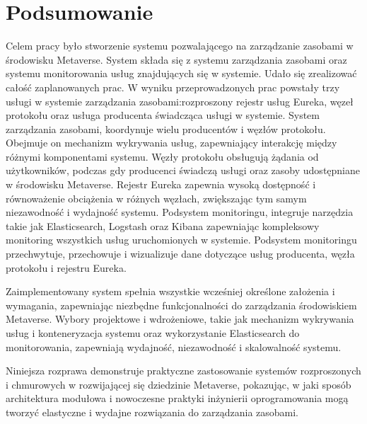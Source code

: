 \chapter{Podsumowanie}

Celem pracy było stworzenie systemu  pozwalającego na zarządzanie zasobami w środowisku Metaverse. System składa się z systemu zarządzania zasobami oraz systemu monitorowania usług znajdujących się w systemie. Udało się zrealizować całość zaplanowanych prac. W wyniku przeprowadzonych prac powstały trzy usługi w systemie zarządzania zasobami:rozproszony rejestr usług Eureka, węzeł protokołu oraz usługa producenta świadcząca usługi w systemie. System zarządzania zasobami, koordynuje wielu producentów i węzłów protokołu. Obejmuje on mechanizm wykrywania usług, zapewniający interakcję między różnymi komponentami systemu. Węzły protokołu obsługują żądania od użytkowników, podczas gdy producenci świadczą usługi oraz zasoby udostępniane w środowisku Metaverse. Rejestr Eureka zapewnia wysoką dostępność i równoważenie obciążenia w różnych węzłach, zwiększając tym samym niezawodność i wydajność systemu. Podsystem monitoringu, integruje narzędzia takie jak Elasticsearch, Logstash oraz Kibana zapewniając kompleksowy monitoring wszystkich usług uruchomionych w systemie. Podsystem monitoringu przechwytuje, przechowuje i wizualizuje dane dotyczące usług producenta, węzła protokołu i rejestru Eureka. 

Zaimplementowany system spełnia wszystkie wcześniej określone założenia i wymagania, zapewniając niezbędne funkcjonalności do zarządzania środowiskiem Metaverse. Wybory projektowe i wdrożeniowe, takie jak mechanizm wykrywania usług i konteneryzacja systemu oraz wykorzystanie Elasticsearch do monitorowania, zapewniają wydajność, niezawodność i skalowalność systemu.

Niniejsza rozprawa demonstruje praktyczne zastosowanie systemów rozproszonych i chmurowych w rozwijającej się dziedzinie Metaverse, pokazując, w jaki sposób architektura modułowa i nowoczesne praktyki inżynierii oprogramowania mogą tworzyć elastyczne i wydajne rozwiązania do zarządzania zasobami.

